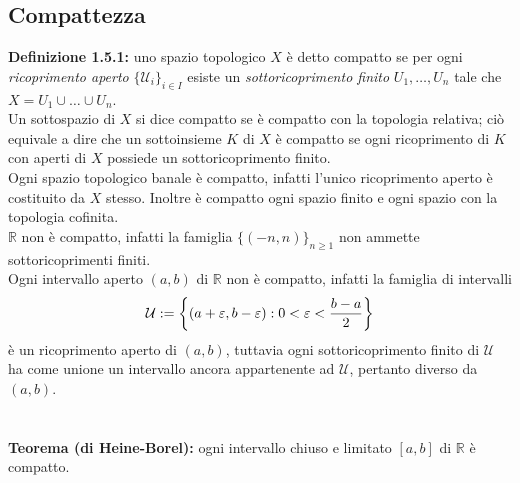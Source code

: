 \documentclass{article}
\begin{document}
\subsection{Compattezza}
\textbf{Definizione 1.5.1:} uno spazio topologico $X$ è detto compatto se per ogni \textit{ricoprimento aperto} $\{ \mathcal{U}_i \}_{i \in I}$ esiste un \textit{sottoricoprimento finito} $U_1, \dots, U_n$ tale che $X = U_1 \cup \dots \cup U_n$. \\
Un sottospazio di $X$ si dice compatto se è compatto con la topologia relativa; ciò equivale a dire che un sottoinsieme $K$ di $X$ è compatto se ogni ricoprimento di $K$ con aperti di $X$ possiede un sottoricoprimento finito. \\
Ogni spazio topologico banale è compatto, infatti l'unico ricoprimento aperto è costituito da $X$ stesso. Inoltre è compatto ogni spazio finito e ogni spazio con la topologia cofinita. \\
$\mathbb{R}$ non è compatto, infatti la famiglia $\{ (-n, n) \}_{n \geq 1}$ non ammette sottoricoprimenti finiti. \\
Ogni intervallo aperto $(a, b)$ di $\mathbb{R}$ non è compatto, infatti la famiglia di intervalli
\begin{gather}
    \mathcal{U} := \left\{ (a + \varepsilon, b - \varepsilon) : 0 < \varepsilon < \frac{b - a}{2} \right\} \notag
\end{gather}
è un ricoprimento aperto di $(a, b)$, tuttavia ogni sottoricoprimento finito di $\mathcal{U}$ ha come unione un intervallo ancora appartenente ad $\mathcal{U}$, pertanto diverso da $(a, b)$. \\ \\ \\
\textbf{Teorema (di Heine-Borel):} ogni intervallo chiuso e limitato $[a, b]$ di $\mathbb{R}$ è compatto. \\
\end{document}
